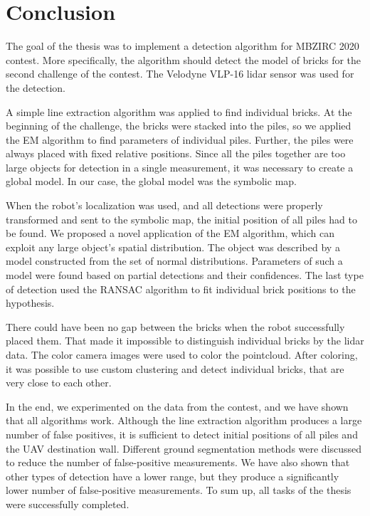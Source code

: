 \chapter{Conclusion}
\label{ch:conclusion}
The goal of the thesis was to implement a detection algorithm for MBZIRC 2020 contest. More specifically, the algorithm should detect the model of bricks for the second challenge of the contest. The Velodyne VLP-16 lidar sensor was used for the detection. 

A simple line extraction algorithm was applied to find individual bricks. At the beginning of the challenge, the bricks were stacked into the piles, so we applied the EM algorithm to find parameters of individual piles. Further, the piles were always placed with fixed relative positions. Since all the piles together are too large objects for detection in a single measurement, it was necessary to create a global model. In our case, the global model was the symbolic map.

When the robot's localization was used, and all detections were properly transformed and sent to the symbolic map, the initial position of all piles had to be found. We proposed a novel application of the EM algorithm, which can exploit any large object’s spatial distribution. The object was described by a model constructed from the set of normal distributions. Parameters of such a model were found based on partial detections and their confidences. The last type of detection used the RANSAC algorithm to fit individual brick positions to the hypothesis.

There could have been no gap between the bricks when the robot successfully placed them. That made it impossible to distinguish individual bricks by the lidar data. The color camera images were used to color the pointcloud. After coloring, it was possible to use custom clustering and detect individual bricks, that are very close to each other.

In the end, we experimented on the data from the contest, and we have shown that all algorithms work. Although the line extraction algorithm produces a large number of false positives, it is sufficient to detect initial positions of all piles and the UAV destination wall. Different ground segmentation methods were discussed to reduce the number of false-positive measurements. We have also shown that other types of detection have a lower range, but they produce a significantly lower number of false-positive measurements. To sum up, all tasks of the thesis were successfully completed.